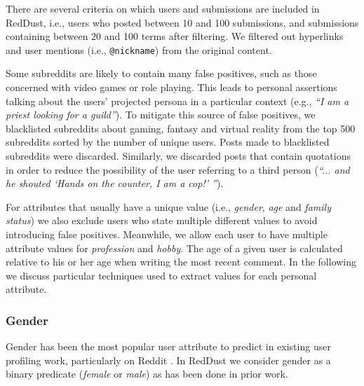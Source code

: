 There are several criteria on which users and submissions are included in RedDust, i.e., users who posted between 10 and 100 submissions, and submissions containing between 20 and 100 terms after filtering. We filtered out hyperlinks and user mentions (i.e., \texttt{\small @nickname}) from the original content.

Some subreddits are likely to contain many false positives, such as those concerned with video games or role playing. This leads to personal assertions talking about the users' projected persona in a particular context (e.g., \textit{``I am a priest looking for a guild''}). To mitigate this source of false positives, we blacklisted subreddits about gaming, fantasy and virtual reality from the top 500 subreddits sorted by the number of unique users. Posts made to blacklisted subreddits were discarded. 
Similarly, we discarded posts that contain quotations in order to reduce the possibility of the user referring to a third person (\textit{``... and he shouted `Hands on the counter, I am a cop!' ''}).

For attributes that usually have a unique value (i.e., \textit{gender}, \textit{age} and \textit{family status}) we also exclude users who state multiple different values to avoid introducing false positives. Meanwhile, we allow each user to have multiple attribute values for \textit{profession} and \textit{hobby}. The age of a given user is calculated relative to his or her age when writing the most recent comment. In the following we discuss particular techniques used to extract values for each personal attribute.

\subsubsection{Gender}
Gender has been the most popular user attribute to predict in existing user profiling work, particularly on Reddit \cite{fabian2015privacy,thelwall2018she,Vasilev2018}.
In 
RedDust
we consider gender as a binary predicate (\emph{female} or \emph{male}) 
as has been done in prior work. 

